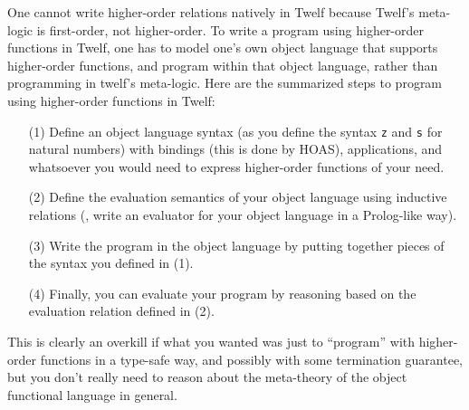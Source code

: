 One cannot write higher-order relations natively in Twelf
because Twelf's meta-logic is first-order, not higher-order.
To write a program using higher-order functions in Twelf, one has to model
one's own object language that supports higher-order functions, and program
within that object language, rather than programming in twelf's meta-logic.
Here are the summarized steps to program using higher-order functions in Twelf:
\begin{itemize}
\item[(1)] Define an object language syntax
	(as you define the syntax \texttt{z} and \texttt{s} for natural numbers)
	with bindings (this is done by HOAS), applications, and whatsoever
	you would need to express higher-order functions of your need.
\item[(2)] Define the evaluation semantics of your object language using
        inductive relations (\ie, write an evaluator for
        your object language in a Prolog-like way).
\item[(3)] Write the program in the object language by putting
        together pieces of the syntax you defined in (1).
\item[(4)] Finally, you can evaluate your program by reasoning based on
        the evaluation relation defined in (2).
\end{itemize}
This is clearly an overkill if what you wanted was just to ``program''
with higher-order functions in a type-safe way, and possibly with some
termination guarantee, but you don't really need to reason about
the meta-theory of the object functional language in general.

